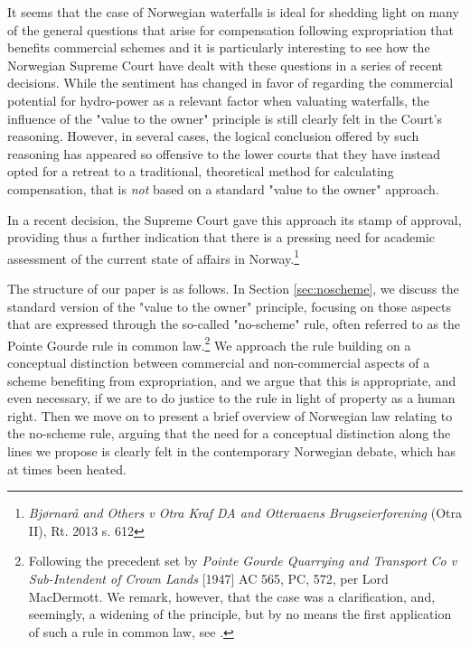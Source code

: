 It seems that the case of Norwegian waterfalls is ideal for shedding light on many of the general questions that arise for compensation following expropriation that benefits commercial schemes and it is particularly interesting to see how the Norwegian Supreme Court have dealt with these questions in a series of recent decisions. While the sentiment has changed in favor of regarding the commercial potential for hydro-power as a relevant factor when valuating waterfalls, the influence of the "value to the owner" principle is still clearly felt in the Court's reasoning. However, in several cases, the logical conclusion offered by such reasoning has appeared so offensive to the lower courts that they have instead opted for a retreat to a traditional, theoretical method for calculating compensation, that is \emph{not} based on a standard "value to the owner" approach.

In a recent decision, the Supreme Court gave this approach its stamp of approval, providing thus a further indication that there is a pressing need for academic assessment of the current state of affairs in Norway.\footnote{\emph{Bjørnarå and Others v Otra Kraf DA and Otteraaens Brugseierforening} (Otra II), Rt. 2013 s. 612}

The structure of our paper is as follows. In Section \ref{sec:noscheme}, we discuss the standard version of the "value to the owner" principle, focusing on those aspects that are expressed through the so-called "no-scheme" rule, often referred to as the Pointe Gourde rule in common law.\footnote{Following the precedent set by \emph{Pointe Gourde Quarrying and Transport Co v Sub-Intendent of Crown Lands} [1947] AC 565,
PC, 572, per Lord MacDermott. We remark, however, that the case was a clarification, and, seemingly, a widening of the principle, but by no means the first application of such a rule in common law, see \cite{lcdisc} .} We approach the rule building on a conceptual distinction between commercial and non-commercial aspects of a scheme benefiting from expropriation, and we argue that this is appropriate, and even necessary, if we are to do justice to the rule in light of property as a human right. Then we move on to present a brief overview of Norwegian law relating to the no-scheme rule, arguing that the need for a conceptual distinction along the lines we propose is clearly felt in the contemporary Norwegian debate, which has at times been heated.

